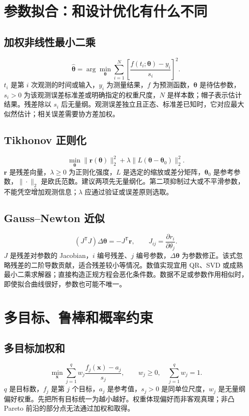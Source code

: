 \section{参数拟合：和设计优化有什么不同}
\subsection{加权非线性最小二乘}
\begin{equation}\widehat{\boldsymbol\theta}=\arg\min_{\boldsymbol\theta}\sum_{i=1}^N\left[\frac{f(t_i;\boldsymbol\theta)-y_i}{s_i}\right]^2.\end{equation}
$t_i$ 是第 $i$ 次观测的时间或输入，$y_i$ 为测量结果，$f$ 为预测函数，$\boldsymbol\theta$ 是待估参数，$s_i>0$ 为该观测误差标准差或明确指定的权重尺度，$N$ 是样本数；帽子表示估计结果。残差除以 $s_i$ 后无量纲。观测误差独立且正态、标准差已知时，它对应最大似然估计；相关误差需要协方差加权。
\subsection{Tikhonov 正则化}
\begin{equation}\min_{\boldsymbol\theta}\|\boldsymbol r(\boldsymbol\theta)\|_2^2+\lambda\|L(\boldsymbol\theta-\boldsymbol\theta_0)\|_2^2.\end{equation}
$\boldsymbol r$ 是残差向量，$\lambda\ge0$ 为正则化强度，$L$ 是选定的缩放或差分矩阵，$\boldsymbol\theta_0$ 是参考参数，$\|\cdot\|_2$ 是欧氏范数。建议两项先无量纲化。第二项抑制过大或不平滑参数，不能凭空增加观测信息；$\lambda$ 应通过验证或误差原则选取。
\subsection{Gauss--Newton 近似}
\begin{equation}(J^\mathsf TJ)\Delta\boldsymbol\theta=-J^\mathsf T\boldsymbol r,\qquad J_{ij}=\frac{\partial r_i}{\partial\theta_j}.\end{equation}
$J$ 是残差对参数的 Jacobian，$i$ 编号残差、$j$ 编号参数，$\Delta\boldsymbol\theta$ 为参数修正。该式忽略残差的二阶导数贡献，适合残差较小等情况。数值实现宜用 QR、SVD 或成熟最小二乘求解器；直接构造正规方程会恶化条件数。数据不足或参数作用相似时，即使拟合曲线很好，参数也可能不唯一。

\section{多目标、鲁棒和概率约束}
\subsection{多目标加权和}
\begin{equation}\min_{\boldsymbol x}\sum_{j=1}^q w_j\frac{f_j(\boldsymbol x)-a_j}{s_j},\qquad w_j\ge0,\quad\sum_{j=1}^q w_j=1.\end{equation}
$q$ 是目标数，$f_j$ 是第 $j$ 个目标，$a_j$ 是参考值，$s_j>0$ 是同单位尺度，$w_j$ 是无量纲偏好权重。先把所有目标统一为越小越好。权重体现偏好而非客观真理；非凸 Pareto 前沿的部分点无法通过加权和取得。
